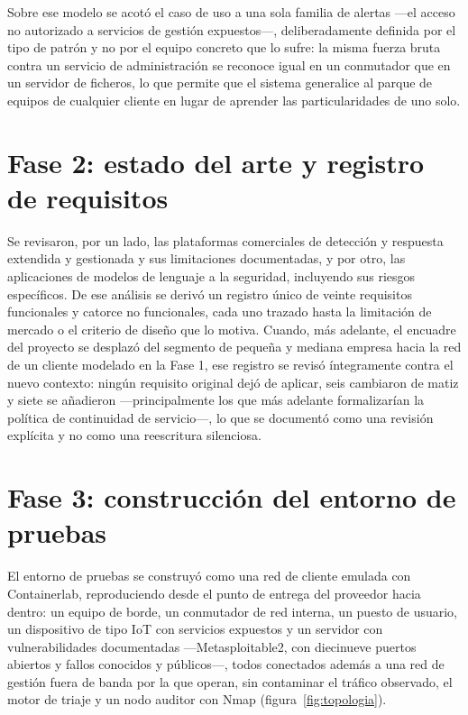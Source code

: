 Sobre ese modelo se acotó el caso de uso a una sola familia de alertas ---el acceso no autorizado a
servicios de gestión expuestos---, deliberadamente definida por el tipo de patrón y no por el equipo
concreto que lo sufre: la misma fuerza bruta contra un servicio de administración se reconoce igual
en un conmutador que en un servidor de ficheros, lo que permite que el sistema generalice al parque
de equipos de cualquier cliente en lugar de aprender las particularidades de uno solo.

\section{Fase 2: estado del arte y registro de requisitos}

Se revisaron, por un lado, las plataformas comerciales de detección y respuesta extendida y
gestionada y sus limitaciones documentadas, y por otro, las aplicaciones de modelos de lenguaje a
la seguridad, incluyendo sus riesgos específicos. De ese análisis se derivó un registro único de
veinte requisitos funcionales y catorce no funcionales, cada uno trazado hasta la limitación de
mercado o el criterio de diseño que lo motiva. Cuando, más adelante, el encuadre del proyecto se
desplazó del segmento de pequeña y mediana empresa hacia la red de un cliente modelado en la Fase 1,
ese registro se revisó íntegramente contra el nuevo contexto: ningún requisito original dejó de
aplicar, seis cambiaron de matiz y siete se añadieron ---principalmente los que más adelante
formalizarían la política de continuidad de servicio---, lo que se documentó como una revisión
explícita y no como una reescritura silenciosa.

\section{Fase 3: construcción del entorno de pruebas}

El entorno de pruebas se construyó como una red de cliente emulada con Containerlab, reproduciendo
desde el punto de entrega del proveedor hacia dentro: un equipo de borde, un conmutador de red
interna, un puesto de usuario, un dispositivo de tipo IoT con servicios expuestos y un servidor con
vulnerabilidades documentadas ---Metasploitable2, con diecinueve puertos abiertos y fallos conocidos
y públicos---, todos conectados además a una red de gestión fuera de banda por la que operan, sin
contaminar el tráfico observado, el motor de triaje y un nodo auditor con Nmap \cite{nmap}
(figura~\ref{fig:topologia}).

